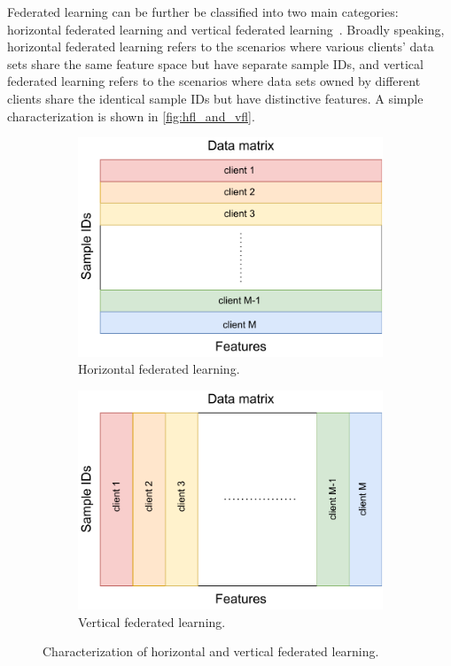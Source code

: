 Federated learning can be further be classified into two main categories: horizontal federated learning and vertical federated learning~\cite{yang2019federated}. Broadly speaking, horizontal federated learning refers to the scenarios where various clients' data sets share the same feature space but have separate sample IDs, and vertical federated learning refers to the scenarios where data sets owned by different clients share the identical sample IDs but have distinctive features. A simple characterization is shown in \autoref{fig:hfl_and_vfl}. 

\begin{figure}[t] 
    \begin{subfigure}{.48\textwidth}
      \centering
      \includegraphics[width=\linewidth]{./figures/hfl_illustration.pdf}
      \captionsetup{justification=centering}
      \caption{Horizontal federated learning.}
      \label{fig:hfl}
    \end{subfigure}
    \hfill
    \begin{subfigure}{.48\textwidth}
      \centering
      \includegraphics[width=\linewidth]{./figures/vfl_illustration.pdf}
      \captionsetup{justification=centering}
      \caption{Vertical federated learning.}
      \label{fig:vfl}
    \end{subfigure}
    \captionsetup{justification=centering}
    \caption{Characterization of horizontal and vertical federated learning.}
    \label{fig:hfl_and_vfl}
\end{figure}


